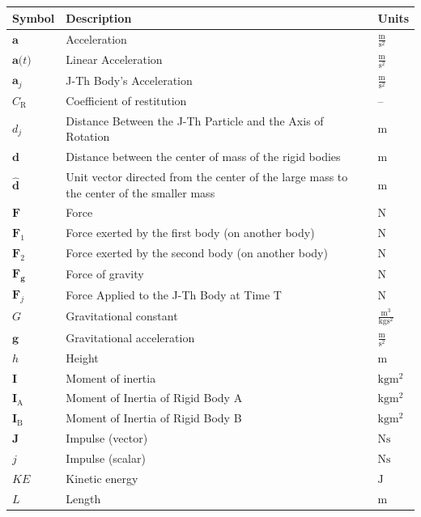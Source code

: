 \documentclass[12pt]{article}
\begin{document}
\begin{longtabu}{l X[l] l}
\toprule
\textbf{Symbol} & \textbf{Description} & \textbf{Units}
\\
\midrule
\endhead
$\mathbf{a}$ & Acceleration & $\frac{\text{m}}{\text{s}^{2}}$
\\
$\mathbf{a}\text{(}t\text{)}$ & Linear Acceleration & $\frac{\text{m}}{\text{s}^{2}}$
\\
${\mathbf{a}_{j}}$ & J-Th Body's Acceleration & $\frac{\text{m}}{\text{s}^{2}}$
\\
${C_{\text{R}}}$ & Coefficient of restitution & --
\\
${d_{j}}$ & Distance Between the J-Th Particle and the Axis of Rotation & ${\text{m}}$
\\
$\mathbf{d}$ & Distance between the center of mass of the rigid bodies & ${\text{m}}$
\\
$\mathbf{\hat{d}}$ & Unit vector directed from the center of the large mass to the center of the smaller mass & ${\text{m}}$
\\
$\mathbf{F}$ & Force & ${\text{N}}$
\\
${\mathbf{F}_{1}}$ & Force exerted by the first body (on another body) & ${\text{N}}$
\\
${\mathbf{F}_{2}}$ & Force exerted by the second body (on another body) & ${\text{N}}$
\\
${\mathbf{F}_{\mathbf{g}}}$ & Force of gravity & ${\text{N}}$
\\
${\mathbf{F}_{j}}$ & Force Applied to the J-Th Body at Time T & ${\text{N}}$
\\
$G$ & Gravitational constant & $\frac{\text{m}^{3}}{\text{kg}\text{s}^{2}}$
\\
$\mathbf{g}$ & Gravitational acceleration & $\frac{\text{m}}{\text{s}^{2}}$
\\
$h$ & Height & ${\text{m}}$
\\
$\mathbf{I}$ & Moment of inertia & $\text{kg}\text{m}^{2}$
\\
${\mathbf{I}_{\text{A}}}$ & Moment of Inertia of Rigid Body A & $\text{kg}\text{m}^{2}$
\\
${\mathbf{I}_{\text{B}}}$ & Moment of Inertia of Rigid Body B & $\text{kg}\text{m}^{2}$
\\
$\mathbf{J}$ & Impulse (vector) & $\text{N}\text{s}$
\\
$j$ & Impulse (scalar) & $\text{N}\text{s}$
\\
$KE$ & Kinetic energy & ${\text{J}}$
\\
$L$ & Length & ${\text{m}}$
\\

\end{longtabu}
\end{document}
